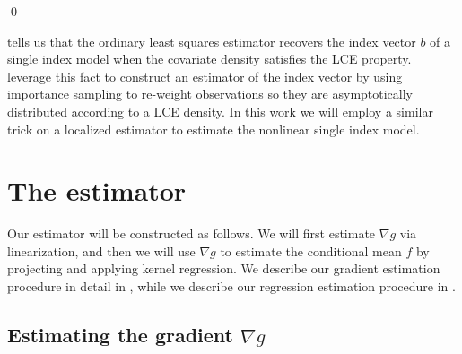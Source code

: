 \documentclass[11pt]{article}
\begin{document}
\qed{}

 tells us that the ordinary least squares estimator recovers the index vector $b$ of a single index model when the covariate density satisfies the LCE property. \citet{Newey_Ruud_2005} leverage this fact to construct an estimator of the index vector by using importance sampling to re-weight observations so they are asymptotically distributed according to a LCE density. In this work we will employ a similar trick on a localized estimator to estimate the nonlinear single index model. 

\section{The estimator}

Our estimator will be constructed as follows. We will first estimate $\nabla g$ via linearization, and then we will use $\nabla g$ to estimate the conditional mean $f$ by projecting and applying kernel regression. We describe our gradient estimation procedure in detail in , while we describe our regression estimation procedure in .

\subsection{Estimating the gradient $\nabla g$} \label{sec: gradient estimation}
\end{document}
